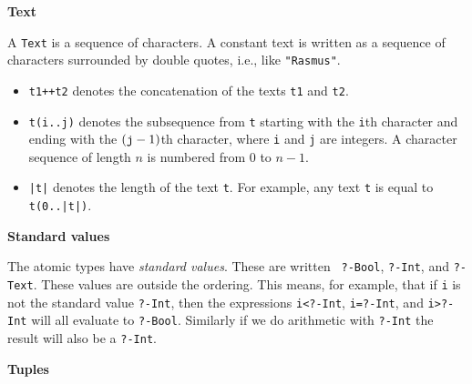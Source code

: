 \documentclass[a4,14pt,latin1]{article}
\begin{document}
\vspace{2ex}
{\bf Text}

A {\tt Text} is a sequence of characters. A constant text is written as
a sequence of characters surrounded by double quotes,
i.e., like {\tt "Rasmus"}.
\begin{itemize}
\item
{\tt t1++t2} denotes the concatenation of the texts {\tt t1} and {\tt t2}.
\item
{\tt t(i..j)} denotes the subsequence from {\tt t} starting with the
{\tt i}th character and ending with the $(\mbox{\tt j}-1)$th character,
where {\tt i} and {\tt j} are integers. A character sequence of length $n$ is
numbered from $0$ to $n-1$.
\item
{\tt |t|} denotes the length of the text {\tt t}. For example, any
text {\tt t} is equal to {\tt t(0..|t|)}.
\end{itemize}

\vspace{2ex}
{\bf Standard values}

The atomic types have {\em standard values}. These are written {\tt
  ?-Bool}, {\tt ?-Int}, and {\tt ?-Text}. These values are outside the
ordering. This means, for example, that if {\tt i} is not the standard
value {\tt ?-Int}, then the expressions {\tt i<?-Int}, {\tt i=?-Int},
and {\tt i>?-Int} will all evaluate to {\tt ?-Bool}. Similarly if we
do arithmetic with {\tt ?-Int} the result will also be a {\tt ?-Int}.

\vspace{2ex}
{\bf Tuples}
\end{document}

